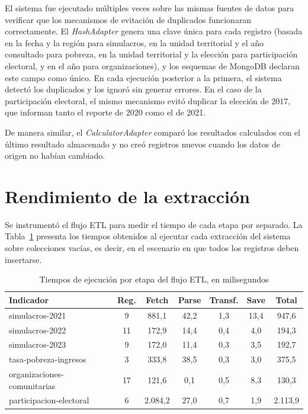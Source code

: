 \documentclass[12pt,letterpaper,oneside]{report}
\begin{document}
El sistema fue ejecutado m\'ultiples veces sobre las mismas fuentes de datos para verificar que los mecanismos de evitaci\'on de duplicados funcionaran correctamente. El \textit{HashAdapter} genera una clave \'unica para cada registro (basada en la fecha y la regi\'on para simulacros, en la unidad territorial y el a\~no consultado para pobreza, en la unidad territorial y la elecci\'on para participaci\'on electoral, y en el a\~no para organizaciones), y los esquemas de MongoDB declaran este campo como \'unico. En cada ejecuci\'on posterior a la primera, el sistema detect\'o los duplicados y los ignor\'o sin generar errores. En el caso de la participaci\'on electoral, el mismo mecanismo evit\'o duplicar la elecci\'on de 2017, que informan tanto el reporte de 2020 como el de 2021.

De manera similar, el \textit{CalculatorAdapter} compar\'o los resultados calculados con el \'ultimo resultado almacenado y no cre\'o registros nuevos cuando los datos de origen no hab\'ian cambiado.

\section{Rendimiento de la extracci\'on}
\label{sec:rendimiento}

Se instrument\'o el flujo ETL para medir el tiempo de cada etapa por separado. La Tabla~\ref{tab:rendimiento} presenta los tiempos obtenidos al ejecutar cada extracci\'on del sistema sobre colecciones vac\'ias, es decir, en el escenario en que todos los registros deben insertarse.

\begin{table}[H]
\centering
\caption{Tiempos de ejecuci\'on por etapa del flujo ETL, en milisegundos}
\label{tab:rendimiento}
\begin{tabular}{|l|c|c|c|c|c|c|}
\hline
\textbf{Indicador} & \textbf{Reg.} & \textbf{Fetch} & \textbf{Parse} & \textbf{Transf.} & \textbf{Save} & \textbf{Total} \\
\hline
simulacros-2021 & 9 & 881,1 & 42,2 & 1,3 & 13,4 & 947,6 \\
\hline
simulacros-2022 & 11 & 172,9 & 14,4 & 0,4 & 4,0 & 194,3 \\
\hline
simulacros-2023 & 9 & 172,0 & 11,4 & 0,3 & 3,5 & 192,7 \\
\hline
tasa-pobreza-ingresos & 3 & 333,8 & 38,5 & 0,3 & 3,0 & 375,5 \\
\hline
organizaciones-comunitarias & 17 & 121,6 & 0,1 & 0,5 & 8,3 & 130,3 \\
\hline
participacion-electoral & 6 & 2.084,2 & 27,0 & 0,7 & 1,9 & 2.113,9 \\
\hline
\end{tabular}
\end{table}
\end{document}
